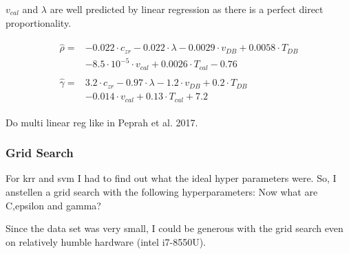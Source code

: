 $v_{cal}$ and $\lambda$ are well predicted by linear regression as there is a perfect direct proportionality. 


\begin{align}
	\begin{split}
		\label{eq:linreg-phd}
		\hat{\rho} =&  -0.022\cdot c_{zr} -0.022\cdot \lambda -0.0029\cdot v_{DB} + 0.0058\cdot T_{DB} \\
		& -8.5\cdot 10^{-5}\cdot v_{cal} + 0.0026\cdot T_{cal} -0.76
	\end{split}
	\\
	\begin{split}
		\label{eq:linreg-G}
		\hat{\gamma} ={} & 3.2\cdot c_{zr} - 0.97\cdot \lambda - 1.2\cdot v_{DB} + 0.2\cdot T_{DB} \\
			& - 0.014\cdot v_{cal} + 0.13\cdot T_{cal} + 7.2
	\end{split}
\end{align}

Do multi linear reg like in Peprah et al. 2017\cite{peprah2017appraisal}.


\subsubsection{Grid Search}
For \gls{krr} and {svm} I had to find out what the ideal hyper parameters were. 
So, I anstellen a grid search with the following hyperparameters: 
Now what are C,epsilon and gamma? 

Since the data set was very small, I could be generous with the grid search even on relatively humble hardware (intel i7-8550U). 

